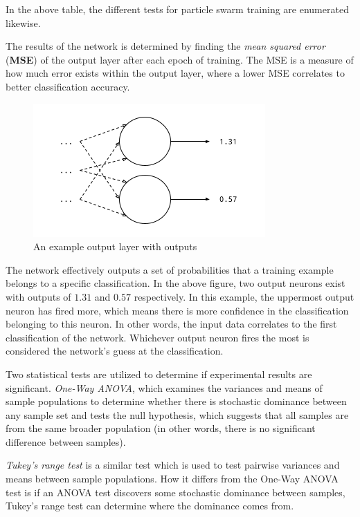 \documentclass[a4paper,12pt]{article}
\begin{document}
In the above table, the different tests for particle swarm training are enumerated likewise.

The results of the network is determined by finding the \textit{mean squared error} (\textbf{MSE}) of the output layer after each epoch of training. The MSE is a measure of how much error exists within the output layer, where a lower MSE correlates to better classification accuracy.

\begin{figure}[h!]
\centering
\includegraphics[scale=0.85]{images/classification-threshold.png}
\caption{An example output layer with outputs}
\label{fig:classification}
\end{figure}

The network effectively outputs a set of probabilities that a training example belongs to a specific classification. In the above figure, two output neurons exist with outputs of $1.31$ and $0.57$ respectively. In this example, the uppermost output neuron has fired more, which means there is more confidence in the classification belonging to this neuron. In other words, the input data correlates to the first classification of the network. Whichever output neuron fires the most is considered the network's guess at the classification.

Two statistical tests are utilized to determine if experimental results are significant. \textit{One-Way ANOVA}, which examines the variances and means of sample populations to determine whether there is stochastic dominance between any sample set and tests the null hypothesis, which suggests that all samples are from the same broader population (in other words, there is no significant difference between samples). 

\textit{Tukey's range test} is a similar test which is used to test pairwise variances and means between sample populations. How it differs from the One-Way ANOVA test is if an ANOVA test discovers some stochastic dominance between samples, Tukey's range test can determine where the dominance comes from.
\end{document}
